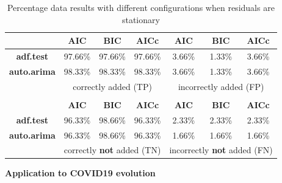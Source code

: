 \documentclass[twoside]{article}
\begin{document}
\begin{table}
    \centering\small 
    \renewcommand{\arraystretch}{1}
    \setlength{\tabcolsep}{10pt}
    \label{simulations}
    \caption{Percentage data results with different configurations when residuals are stationary}
    \vspace{0.5em}
    \begin{tabular}{|c|ccc|ccc|}
        \cline{2-7}
        \multicolumn{1}{c|}{}   & \textbf{AIC}  & \textbf{BIC}  & \textbf{AICc}            & \textbf{AIC}      & \textbf{BIC}   & \textbf{AICc} \\
        \hline       
        \textbf{adf.test}       & 97.66\%       & 97.66\%        & 97.66\%                 & 3.66\%            & 1.33\%         & 3.66\%        \\
        \textbf{auto.arima}     & 98.33\%       & 98.33\%        & 98.33\%                 & 3.66\%            & 1.33\%         & 3.66\%        \\
        \hline
        \multicolumn{1}{|c|}{}   & \multicolumn{3}{c|}{correctly added (TP)}               & \multicolumn{3}{c|}{incorrectly added (FP)}         \\
        \hline 
        \multicolumn{7}{c}{}                                                                                                                    \\
        \cline{2-7}
        \multicolumn{1}{c|}{}   & \textbf{AIC}  & \textbf{BIC}  & \textbf{AICc}           & \textbf{AIC}      & \textbf{BIC}   & \textbf{AICc}  \\ 
        \hline        
        \textbf{adf.test}       & 96.33\%       & 98.66\%        & 96.33\%                & 2.33\%            & 2.33\%         & 2.33\%         \\
        \textbf{auto.arima}     & 96.33\%       & 98.66\%        & 96.33\%                & 1.66\%            & 1.66\%         & 1.66\%         \\
        \hline 
        \multicolumn{1}{|c|}{}   & \multicolumn{3}{c|}{correctly \textbf{not} added (TN)} & \multicolumn{3}{c|}{incorrectly \textbf{not} added (FN)}  \\
        \hline
    \end{tabular}
\end{table}



\begin{center}
\textbf{Application to COVID19 evolution}
\end{center}
\end{document}
